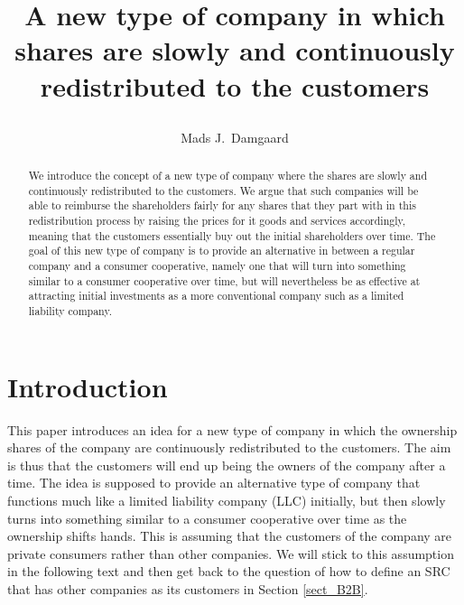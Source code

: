 \documentclass{article}
\title{
	A new type of company in which shares are slowly and continuously redistributed to the customers
	\author{Mads J.\ Damgaard%
	}
}
\begin{document}
\maketitle

\begin{abstract}
	We introduce the concept of a new type of company where the shares are slowly and continuously redistributed to the customers. 
	We argue that such companies will be able to reimburse the shareholders fairly for any shares that they part with in this redistribution process by raising the prices for it goods and services accordingly, meaning that the customers essentially buy out the initial shareholders over time. 
	The goal of this new type of company is to provide an alternative in between a regular company and a consumer cooperative, namely one that will turn into something similar to a consumer cooperative over time, but will nevertheless be as effective at attracting initial investments as a more conventional company such as a limited liability company.
\end{abstract}


\section{Introduction}
This paper introduces an idea for a new type of company in which the ownership shares of the company are continuously redistributed to the customers. The aim is thus that the customers will end up being the owners of the company after a time. The idea is supposed to provide an alternative type of company that functions much like a limited liability company (LLC) initially, but then slowly turns into something similar to a consumer cooperative over time as the ownership shifts hands. 
%
This is assuming that the customers of the company are private consumers rather than other companies. We will stick to this assumption in the following text and then get back to the question of how to define an SRC that has other companies as its customers in Section \ref{sect_B2B}. 
\end{document}
